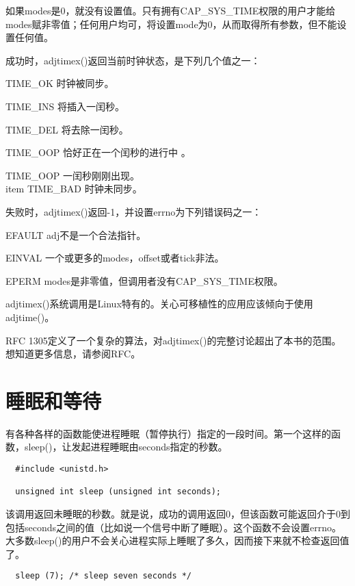 如果modes是0，就没有设置值。只有拥有CAP\_SYS\_TIME权限的用户才能给modes赋非零值；任何用户均可，将设置mode为0，从而取得所有参数，但不能设置任何值。

成功时，adjtimex()返回当前时钟状态，是下列几个值之一： 

\begin{eqlist*}
\item [TIME\_OK]
时钟被同步。 
\item [TIME\_INS]
将插入一闰秒。
\item [TIME\_DEL]
将去除一闰秒。 
\item [TIME\_OOP]
恰好正在一个闰秒的进行中 。
\item [TIME\_OOP]
一闰秒刚刚出现。 
\\item [TIME\_BAD]
时钟未同步。 
\end{eqlist*}

失败时，adjtimex()返回-1，并设置errno为下列错误码之一： 

\begin{eqlist*}
\item [EFAULT]
adj不是一个合法指针。 
\item [EINVAL]
一个或更多的modes，offset或者tick非法。 
\item [EPERM]
modes是非零值，但调用者没有CAP\_SYS\_TIME权限。 
\end{eqlist*}

adjtimex()系统调用是Linux特有的。关心可移植性的应用应该倾向于使用adjtime()。

RFC 1305定义了一个复杂的算法，对adjtimex()的完整讨论超出了本书的范围。想知道更多信息，请参阅RFC。 

\section{睡眠和等待}

有各种各样的函数能使进程睡眠（暂停执行）指定的一段时间。第一个这样的函数，sleep()，让发起进程睡眠由seconds指定的秒数。 

\begin{lstlisting}
﻿  #include <unistd.h>

  unsigned int sleep (unsigned int seconds);
\end{lstlisting}

该调用返回未睡眠的秒数。就是说，成功的调用返回0，但该函数可能返回介于0到包括seconds之间的值（比如说一个信号中断了睡眠）。这个函数不会设置errno。大多数sleep()的用户不会关心进程实际上睡眠了多久，因而接下来就不检查返回值了。 

\begin{lstlisting}
﻿  sleep (7); /* sleep seven seconds */
\end{lstlisting}

